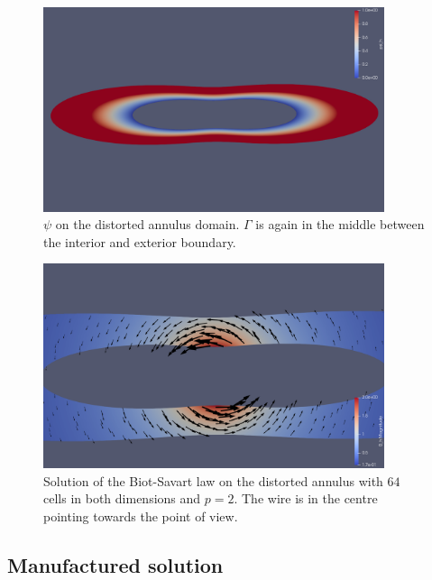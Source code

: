 \documentclass[../master_thesis.tex]{subfiles}
\begin{document}
\begin{figure}
    \centering
    \includegraphics[width=10cm]{plot_files/biot_savart_distorted/psi_h.png}
    \caption{$\psi$ on the distorted annulus domain. $\Gamma$ is again 
        in the middle between the interior and exterior boundary.
    }
    \label{fig:psi_distorted_annulus}
\end{figure}
\begin{figure}
    \centering
    \includegraphics[width=10cm]{plot_files/biot_savart_distorted/B_h.png}
    \caption{Solution of the Biot-Savart law on the distorted annulus 
    with $64$ cells in both dimensions and $p=2$. The wire 
    is in the centre pointing towards the point of view.
    }
    \label{fig:distorted_annulus_plot}
\end{figure}

\subsection{Manufactured solution}
\end{document}
